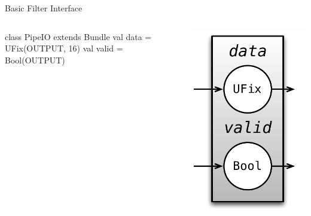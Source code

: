 \documentclass[xcolor=pdflatex,dvipsnames,table]{beamer}
\begin{document}
\begin{frame}[fragile]{Basic Filter Interface}

\begin{columns}

\begin{scala}
class PipeIO extends Bundle { 
  val data  = UFix(OUTPUT, 16) 
  val valid = Bool(OUTPUT)
}
\end{scala}


\begin{center}
\includegraphics[height=0.9\textheight]{figs/link-io.pdf} 
\end{center}

\end{columns}
\end{frame}
\end{document}
